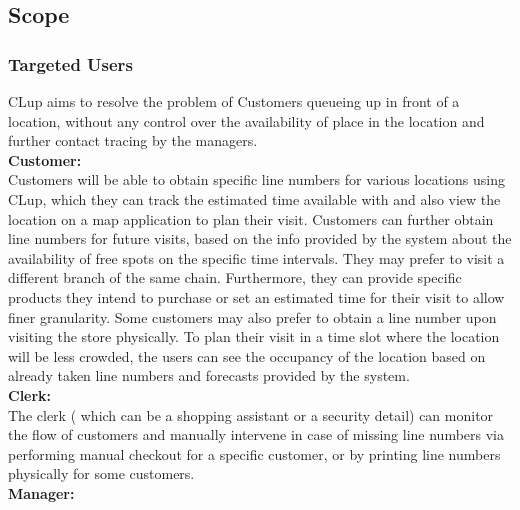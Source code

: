 

\subsection{Scope}

\subsubsection{Targeted Users}

CLup aims to resolve the problem of Customers queueing up in front of a location, without any control over the availability of place in the location and further contact tracing by the managers.
\\[0.5cm]
\textbf{Customer:} \\

Customers will be able to obtain specific line numbers for various locations using CLup, which they can track the estimated time available with and also view the location on a map application to plan their visit.
Customers can further obtain line numbers for future visits, based on the info provided by the system about the availability of free spots on the specific time intervals.
They may prefer to visit a different branch of the same chain.
Furthermore, they can provide specific products they intend to purchase or set an estimated time for their visit to allow finer granularity.
Some customers may also prefer to obtain a line number upon visiting the store physically.
To plan their visit in a time slot where the location will be less crowded, the users can see the occupancy of the location based on already taken line numbers and forecasts provided by the system.
\\[0.5cm]
\textbf{Clerk:} \\
The clerk ( which can be a shopping assistant or a security detail) can monitor the flow of customers and manually intervene in case of missing line numbers via performing manual checkout for a specific customer, or by printing line numbers physically for some customers.
\\[0.5cm]
\textbf{Manager:} \\

